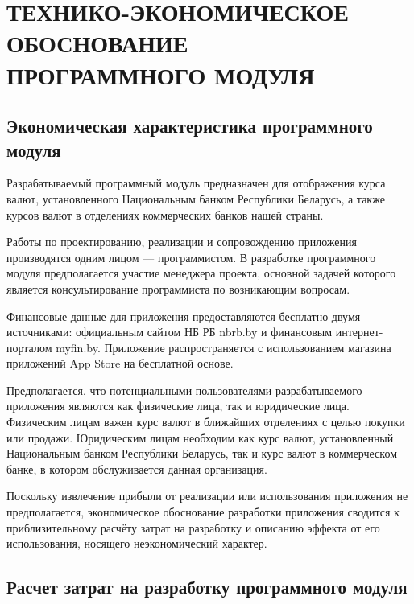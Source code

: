 \section[Технико-экономическое обоснование программного модуля]
{ТЕХНИКО-ЭКОНОМИЧЕСКОЕ ОБОСНОВАНИЕ \\ ПРОГРАММНОГО МОДУЛЯ}

\label{sec:teo}


\subsection{Экономическая характеристика программного модуля}

Разрабатываемый программный модуль предназначен для отображения курса валют,
установленного Национальным банком Республики Беларусь, а также курсов
валют в отделениях коммерческих банков нашей страны.

Работы по проектированию, реализации и сопровождению приложения
производятся одним лицом --- программистом.
В разработке программного модуля предполагается участие менеджера проекта,
основной задачей которого является консультирование программиста
по возникающим вопросам.

Финансовые данные для приложения предоставляются бесплатно двумя источниками:
официальным сайтом НБ РБ nbrb.by и финансовым интернет-порталом myfin.by.
Приложение распространяется с использованием магазина приложений App Store
на бесплатной основе.

Предполагается, что потенциальными пользователями разрабатываемого приложения
являются как физические лица, так и юридические лица. Физическим лицам важен
курс валют в ближайших отделениях с целью покупки или продажи.
Юридическим лицам необходим как курс валют, установленный Национальным
банком Республики Беларусь, так и курс валют в коммерческом банке,
в котором обслуживается данная организация.

Поскольку извлечение прибыли от реализации или использования приложения
не предполагается, экономическое обоснование разработки приложения
сводится к приблизительному расчёту затрат на разработку и
описанию эффекта от его использования, носящего неэкономический характер.



\subsection{Расчет затрат на разработку программного модуля}


